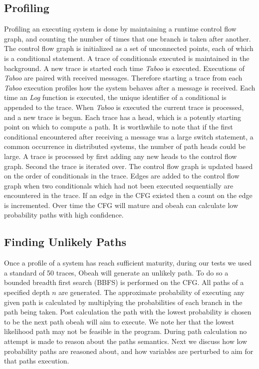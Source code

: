 \subsection{Profiling}

Profiling an executing system is done by maintaining a runtime control flow
graph, and counting the number of times that one branch is taken after another.
The control flow graph is initialized as a set of unconnected points, each of
which is a conditional statement. A trace of conditionals executed is
maintained in the background. A new trace is started each time \emph{Taboo} is
executed. Executions of \emph{Taboo} are paired with received messages.
Therefore starting a trace from each \emph{Taboo} execution profiles how the
system behaves after a message is received. Each time an \emph{Log} function is
executed, the unique identifier of a conditional is appended to the trace. When
\emph{Taboo} is executed the current trace is processed, and a new trace is
begun. Each trace has a head, which is a potently starting point on which to
compute a path. It is worthwhile to note that if the first conditional
encountered after receiving a message was a large switch statement, a common
occurrence in distributed systems, the number of path heads could be large. A
trace is processed by first adding any new heads to the control flow graph.
Second the trace is iterated over. The control flow graph is updated based on
the order of conditionals in the trace. Edges are added to the control flow
graph when two conditionals which had not been executed sequentially are
encountered in the trace. If an edge in the CFG existed then a count on the
edge is incremented. Over time the CFG will mature and obeah can calculate low
probability paths with high confidence.

\subsection{Finding Unlikely Paths}

Once a profile of a system has reach sufficient maturity, during our tests we
used a standard of 50 traces, Obeah will generate an unlikely path. To do so a
bounded breadth first search (BBFS) is performed on the CFG. All paths of a
specified depth $n$ are generated. The approximate probability of executing any
given path is calculated by multiplying the probabilities of each branch in the
path being taken. Post calculation the path with the lowest probability is
chosen to be the next path obeah will aim to execute. We note her that the
lowest likelihood path may not be feasible in the program. During path
calculation no attempt is made to reason about the paths semantics. Next we
discuss how low probability paths are reasoned about, and how variables are
perturbed to aim for that paths execution.

